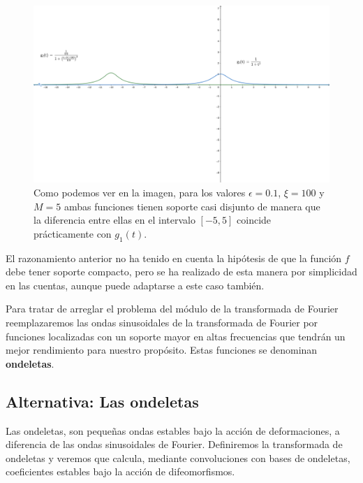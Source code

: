 \begin{observacion}
  \begin{figure}[!h]
    \centering
    \includegraphics[width=1.0\textwidth]{img/geogebra-export_contraejemplo_Fourier.png}
    \caption{Como podemos ver en la imagen, para los valores $\epsilon=0.1$, $\xi=100$ y $M=5$ ambas funciones tienen soporte casi disjunto de manera que la diferencia entre ellas en el intervalo $[-5,5]$ coincide prácticamente con $g_1(t)$.}
    \label{fig:Grafica_funciones}
  \end{figure}

\end{observacion}
 
\medskip

\noindent El razonamiento anterior no ha tenido en cuenta la hipótesis de que la función $f$ debe tener soporte compacto, pero se ha realizado de esta manera por simplicidad en las cuentas, aunque puede adaptarse a este caso también.

\medskip

\noindent Para tratar de arreglar el problema del módulo de la transformada de Fourier  reemplazaremos las ondas sinusoidales de la transformada de Fourier por funciones localizadas con un soporte mayor en altas frecuencias que tendrán un mejor rendimiento para nuestro propósito. Estas funciones se denominan \textbf{ondeletas}. 

\medskip

\subsection{Alternativa: Las ondeletas}

\noindent Las ondeletas, son pequeñas ondas estables bajo la acción de deformaciones, a diferencia de las ondas sinusoidales de Fourier. Definiremos la transformada de ondeletas y veremos que calcula, mediante convoluciones con bases de ondeletas, coeficientes estables bajo la acción de difeomorfismos.

